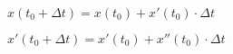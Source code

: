 
$
x( t_{0} + \Delta t) = x(t_{0}) + x'(t_{0}) \cdot \Delta t
$

$
x'( t_{0} + \Delta t) = x'(t_{0}) + x''(t_{0}) \cdot \Delta t
$